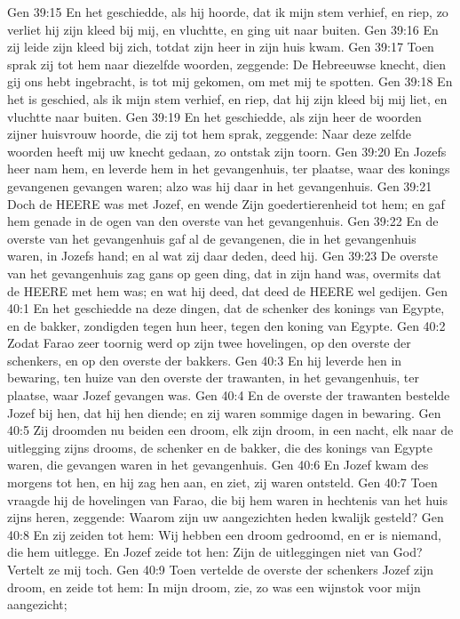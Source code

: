 Gen 39:15  En het geschiedde, als hij hoorde, dat ik mijn stem verhief, en riep, zo verliet hij zijn kleed bij mij, en vluchtte, en ging uit naar buiten.
Gen 39:16  En zij leide zijn kleed bij zich, totdat zijn heer in zijn huis kwam.
Gen 39:17  Toen sprak zij tot hem naar diezelfde woorden, zeggende: De Hebreeuwse knecht, dien gij ons hebt ingebracht, is tot mij gekomen, om met mij te spotten.
Gen 39:18  En het is geschied, als ik mijn stem verhief, en riep, dat hij zijn kleed bij mij liet, en vluchtte naar buiten.
Gen 39:19  En het geschiedde, als zijn heer de woorden zijner huisvrouw hoorde, die zij tot hem sprak, zeggende: Naar deze zelfde woorden heeft mij uw knecht gedaan, zo ontstak zijn toorn.
Gen 39:20  En Jozefs heer nam hem, en leverde hem in het gevangenhuis, ter plaatse, waar des konings gevangenen gevangen waren; alzo was hij daar in het gevangenhuis.
Gen 39:21  Doch de HEERE was met Jozef, en wende Zijn goedertierenheid tot hem; en gaf hem genade in de ogen van den overste van het gevangenhuis.
Gen 39:22  En de overste van het gevangenhuis gaf al de gevangenen, die in het gevangenhuis waren, in Jozefs hand; en al wat zij daar deden, deed hij.
Gen 39:23  De overste van het gevangenhuis zag gans op geen ding, dat in zijn hand was, overmits dat de HEERE met hem was; en wat hij deed, dat deed de HEERE wel gedijen.
Gen 40:1  En het geschiedde na deze dingen, dat de schenker des konings van Egypte, en de bakker, zondigden tegen hun heer, tegen den koning van Egypte.
Gen 40:2  Zodat Farao zeer toornig werd op zijn twee hovelingen, op den overste der schenkers, en op den overste der bakkers.
Gen 40:3  En hij leverde hen in bewaring, ten huize van den overste der trawanten, in het gevangenhuis, ter plaatse, waar Jozef gevangen was.
Gen 40:4  En de overste der trawanten bestelde Jozef bij hen, dat hij hen diende; en zij waren sommige dagen in bewaring.
Gen 40:5  Zij droomden nu beiden een droom, elk zijn droom, in een nacht, elk naar de uitlegging zijns drooms, de schenker en de bakker, die des konings van Egypte waren, die gevangen waren in het gevangenhuis.
Gen 40:6  En Jozef kwam des morgens tot hen, en hij zag hen aan, en ziet, zij waren ontsteld.
Gen 40:7  Toen vraagde hij de hovelingen van Farao, die bij hem waren in hechtenis van het huis zijns heren, zeggende: Waarom zijn uw aangezichten heden kwalijk gesteld?
Gen 40:8  En zij zeiden tot hem: Wij hebben een droom gedroomd, en er is niemand, die hem uitlegge. En Jozef zeide tot hen: Zijn de uitleggingen niet van God? Vertelt ze mij toch.
Gen 40:9  Toen vertelde de overste der schenkers Jozef zijn droom, en zeide tot hem: In mijn droom, zie, zo was een wijnstok voor mijn aangezicht;
